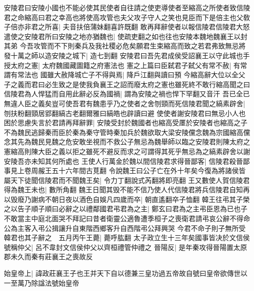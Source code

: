 安陵君曰安陵小國也不能必使其民使者自往請之使吏導使者至縮高之所使者致信陵君之命縮高曰君之幸高也將使高攻管也夫父攻子守人之笑也見臣而下是倍主也父敎子倍亦非君之所喜|{
	夫音扶倍蒲妹翻喜許既翻}
敢再拜辭使者以報信陵君信陵君大怒遣使之安陵君所曰安陵之地亦猶魏也|{
	使疏吏翻之如也往也安陵本魏地魏襄王以封其弟}
今吾攻管而不下則秦兵及我社稷必危矣願君生束縮高而致之若君弗致無忌將發十萬之師以造安陵之城下|{
	造七到翻}
安陵君曰吾先君成侯受詔襄王以守此城也手授太府之憲|{
	太府魏國藏圖籍之府憲法也}
憲之上篇曰臣弑君子弑父有常不赦|{
	有常謂有常法也}
國雖大赦降城亡子不得與焉|{
	降戶江翻與讀曰預}
今縮高辭大位以全父子之義而君曰必生致之是使我負襄王之詔而廢太府之憲也雖死終不敢行縮高聞之曰信陵君為人悍猛而自用此辭必反為國禍|{
	謂為安陵之禍也悍下罕翻又音汗}
吾已全已無違人臣之義矣豈可使吾君有魏患乎乃之使者之舍刎頸而死信陵君聞之縞素辟舍|{
	刎扶粉翻頸居郢翻縞古老翻爾雅曰縞皓也辟讀曰避}
使使者謝安陵君曰無忌小人也困於思慮失言於君請再拜辭罪|{
	安陵受封於魏國者也縮高受㕓於安陵者也縮高之子不為魏民逃歸秦而臣於秦為秦守管時秦加兵於魏欲取大梁安陵儻念魏為宗國縮高儻念其先為魏民見魏之危安敢坐視而不救公子無忌為魏舉師以臨之安陵君則陳太府之憲縮高則陳大臣之義以拒之雖死不避反而求之可謂得其死乎無忌為之縞素辟舍以謝安陵吾亦未知其何所處也}
王使人行萬金於魏以間信陵君求得晉鄙客|{
	信陵君殺晉鄙事見上卷周赧王五十六年間古莧翻}
令說魏王曰公子亡在外十年矣今復為將諸侯皆屬天下徒聞信陵君而不聞魏王矣|{
	令力丁翻說式芮翻將即亮翻}
王又數使人賀信陵君得為魏王未也|{
	數所角翻}
魏王日聞其毁不能不信乃使人代信陵君將兵信陵君自知再以毁廢乃謝病不朝日夜以酒色自娛凡四歲而卒|{
	朝直遙翻卒子恤翻}
韓王往弔其子榮之以告子順子順曰必辭之以禮鄰國君弔君為之主|{
	鄭玄曰君為之主弔臣恩為已也子不敢當主中庭北面哭不拜記曰昔者衛靈公適魯遭季桓子之喪衛君請弔哀公辭不得命公為主客入弔公揖讓升自東階西鄉客升自西階弔公拜興哭}
今君不命子則子無所受韓君也其子辭之　五月丙午王薨|{
	薨呼肱翻}
太子政立生十三年矣國事皆决於文信侯號稱仲父|{
	呂不韋封文信侯仲父以齊桓禮管仲禮之}
晉陽反|{
	是年秦攻得晉陽置太原郡未久而秦有莊襄王之喪故反}


始皇帝上|{
	諱政莊襄王子也王并天下自以德兼三皇功過五帝故自號曰皇帝欲傳世以一至萬乃除諡法號始皇帝}


